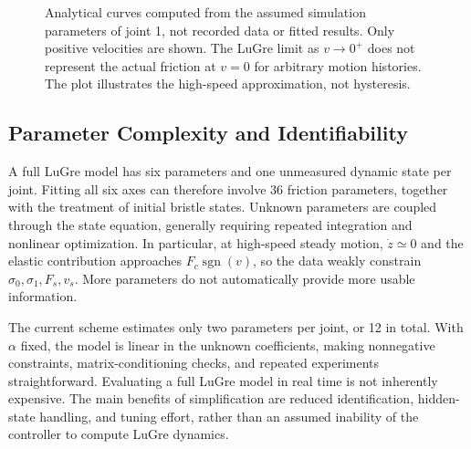 \documentclass[11pt,a4paper]{report}
\newcommand{\sgn}{\operatorname{sgn}}
\begin{document}
\begin{figure}[htbp]
\centering
{}
\caption{Analytical curves computed from the assumed simulation parameters of joint 1, not recorded data or fitted results. Only positive velocities are shown. The LuGre limit as $v\to0^+$ does not represent the actual friction at $v=0$ for arbitrary motion histories. The plot illustrates the high-speed approximation, not hysteresis.}
\label{fig:steady}
\end{figure}

\subsection{Parameter Complexity and Identifiability}
A full LuGre model has six parameters and one unmeasured dynamic state per joint. Fitting all six axes can therefore involve 36 friction parameters, together with the treatment of initial bristle states. Unknown parameters are coupled through the state equation, generally requiring repeated integration and nonlinear optimization. In particular, at high-speed steady motion, $\dot z\simeq0$ and the elastic contribution approaches $F_c\sgn(v)$, so the data weakly constrain $\sigma_0,\sigma_1,F_s,v_s$. More parameters do not automatically provide more usable information.

The current scheme estimates only two parameters per joint, or 12 in total. With $\alpha$ fixed, the model is linear in the unknown coefficients, making nonnegative constraints, matrix-conditioning checks, and repeated experiments straightforward. Evaluating a full LuGre model in real time is not inherently expensive. The main benefits of simplification are reduced identification, hidden-state handling, and tuning effort, rather than an assumed inability of the controller to compute LuGre dynamics.
\end{document}
